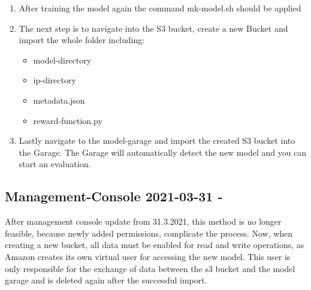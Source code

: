 \begin{enumerate}
    \item After training the model again the command mk-model.sh should be applied 
    \item The next step is to navigate into the S3 bucket, create a new Bucket and import the whole folder including:
    \begin{itemize}
        \item model-directory
        \item ip-directory
        \item metadata.json
        \item reward-function.py
    \end{itemize}
    \item Lastly navigate to the model-garage and import the created S3 bucket into the Garage. The Garage will automatically detect the new model and you can start an evaluation.
\end{enumerate}

\subsection{Management-Console 2021-03-31 - }
After management console update from 31.3.2021, this method is no longer feasible, because newly added permissions, complicate the process. Now, when creating a new bucket, all data must be enabled for read and write operations, as Amazon creates its own virtual user for accessing the new model. This user is only responsible for the exchange of data between the s3 bucket and the model garage and is deleted again after the successful import.

